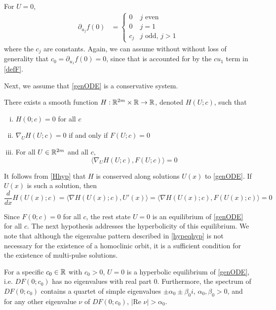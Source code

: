 \documentclass[thesis.tex]{subfiles}
\begin{document}
For $U = 0$,
\begin{align}\label{fpartials0}
\partial_{u_j} f(0) &= \begin{cases}
0 & j \text{ even}\\
0 & j = 1 \\
c_j & j \text{ odd, } j > 1
\end{cases}
\end{align}
where the $c_j$ are constants. Again, we can assume without without loss of generality that $c_0 = \partial_{u_1} f(0) = 0$, since that is accounted for by the $c u_1$ term in \cref{defF}.

Next, we assume that \cref{genODE} is a conservative system.

\begin{hypothesis}\label{Hhyp}
There exists a smooth function $H: \mathbb{R}^{2m} \times \mathbb{R} \rightarrow \mathbb{R}$, denoted $H(U; c)$, such that 
\begin{enumerate}[(i)]
\item $H(0; c) = 0$ for all $c$
\item $\nabla_U H(U; c) = 0$ if and only if $F(U; c) = 0$
\item For all $U \in \mathbb{R}^{2m}$ and all $c$,
\begin{equation}
\langle \nabla_U H(U; c), F(U; c) \rangle = 0
\end{equation}
\end{enumerate}
\end{hypothesis}

\noi It follows from \cref{Hhyp} that $H$ is conserved along solutions $U(x)$ to \cref{genODE}. If $U(x)$ is such a solution, then
\[
\frac{d}{dx}H(U(x); c) = \langle \nabla H(U(x); c), U'(x) \rangle
= \langle \nabla H(U(x); c), F(U(x); c) \rangle = 0
\]

Since $F(0; c) = 0$ for all $c$, the rest state $U = 0$ is an equilibrium of \cref{genODE} for all $c$. The next hypothesis addresses the hyperbolicity of this equilibrium. We note that although the eigenvalue pattern described in \cref{hypeqhyp} is not necessary for the existence of a homoclinic orbit, it is a sufficient condition for the existence of multi-pulse solutions.

\begin{hypothesis}\label{hypeqhyp}
For a specific $c_0 \in \mathbb{R}$ with $c_0 > 0$, $U = 0$ is a hyperbolic equilibrium of \cref{genODE}, i.e. $DF(0; c_0)$ has no eigenvalues with real part 0. Furthermore, the spectrum of $DF(0; c_0)$ contains a quartet of simple eigenvalues $\pm \alpha_0 \pm \beta_0 i$, $\alpha_0, \beta_0 > 0$, and for any other eigenvalue $\nu$ of $DF(0; c_0)$, $|\text{Re }\nu| > \alpha_0$.
\end{hypothesis}
\end{document}
